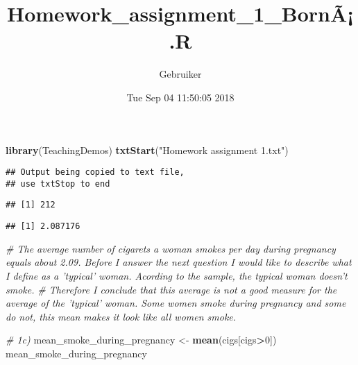 \documentclass[]{article}
\title{Homework\_assignment\_1\_BornÃ¡.R}
\author{Gebruiker}
\date{Tue Sep 04 11:50:05 2018}
\newenvironment{Shaded}{\begin{snugshade}}{\end{snugshade}}
\newcommand{\CommentTok}[1]{\textcolor[rgb]{0.56,0.35,0.01}{\textit{#1}}}
\newcommand{\DecValTok}[1]{\textcolor[rgb]{0.00,0.00,0.81}{#1}}
\newcommand{\KeywordTok}[1]{\textcolor[rgb]{0.13,0.29,0.53}{\textbf{#1}}}
\newcommand{\NormalTok}[1]{#1}
\newcommand{\OperatorTok}[1]{\textcolor[rgb]{0.81,0.36,0.00}{\textbf{#1}}}
\newcommand{\StringTok}[1]{\textcolor[rgb]{0.31,0.60,0.02}{#1}}
\begin{document}
\maketitle

\begin{Shaded}
\begin{Highlighting}[]
\KeywordTok{library}\NormalTok{(TeachingDemos)}
\KeywordTok{txtStart}\NormalTok{(}\StringTok{"Homework assignment 1.txt"}\NormalTok{)}
\end{Highlighting}
\end{Shaded}

\begin{verbatim}
## Output being copied to text file,
## use txtStop to end
\end{verbatim}

\begin{Shaded}
\end{Shaded}

\begin{verbatim}
## [1] 212
\end{verbatim}

\begin{Shaded}
\end{Shaded}

\begin{verbatim}
## [1] 2.087176
\end{verbatim}

\begin{Shaded}
\begin{Highlighting}[]
\CommentTok{# The average number of cigarets a woman smokes per day during pregnancy equals about 2.09. Before I answer the next question I would like to describe what I define as a 'typical' woman. Acording to the sample, the typical woman doesn't smoke.}
\CommentTok{# Therefore I conclude that this average is not a good measure for the average of the 'typical' woman. Some women smoke during pregnancy and some do not, this mean makes it look like all women smoke.}

\CommentTok{# 1c) }
\NormalTok{mean_smoke_during_pregnancy <-}\StringTok{ }\KeywordTok{mean}\NormalTok{(cigs[cigs}\OperatorTok{>}\DecValTok{0}\NormalTok{])}
\NormalTok{mean_smoke_during_pregnancy}
\end{Highlighting}
\end{Shaded}
\end{document}
